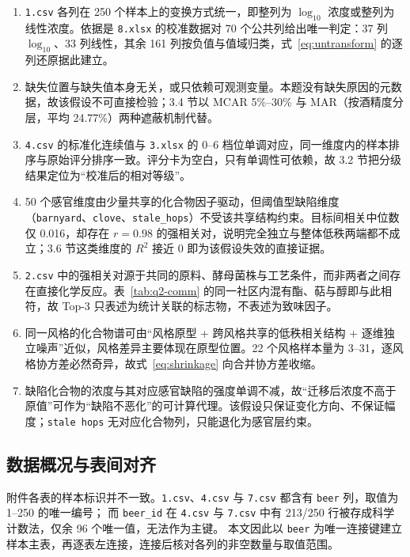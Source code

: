﻿\documentclass[UTF8,a4paper,zihao=-4]{ctexart}
\numberwithin{figure}{section}
\numberwithin{table}{section}
\numberwithin{equation}{section}
\newcommand{\file}[1]{\texttt{#1}}
\begin{document}
\begin{enumerate}[label=\textbf{假设 \arabic*},leftmargin=4.5em,itemsep=2pt,topsep=2pt,parsep=0pt]
  \item \file{1.csv} 各列在 250 个样本上的变换方式统一，即整列为 $\log_{10}$ 浓度或整列为线性浓度。依据是 \file{8.xlsx} 的校准数据对 70 个公共列给出唯一判定：37 列 $\log_{10}$、33 列线性，其余 161 列按负值与值域归类，式~\eqref{eq:untransform} 的逐列还原据此建立。

  \item 缺失位置与缺失值本身无关，或只依赖可观测变量。本题没有缺失原因的元数据，故该假设不可直接检验；3.4 节以 MCAR 5\%--30\% 与 MAR（按酒精度分层，平均 24.77\%）两种遮蔽机制代替。

  \item \file{4.csv} 的标准化连续值与 \file{3.xlsx} 的 0--6 档位单调对应，同一维度内的样本排序与原始评分排序一致。评分卡为空白，只有单调性可依赖，故 3.2 节把分级结果定位为“校准后的相对等级”。

  \item 50 个感官维度由少量共享的化合物因子驱动，但阈值型缺陷维度（\file{barnyard}、\file{clove}、\file{stale\_hops}）不受该共享结构约束。目标间相关中位数仅 0.016，却存在 $r=0.98$ 的强相关对，说明完全独立与整体低秩两端都不成立；3.6 节这类维度的 $R^2$ 接近 0 即为该假设失效的直接证据。

  \item \file{2.csv} 中的强相关对源于共同的原料、酵母菌株与工艺条件，而非两者之间存在直接化学反应。表~\ref{tab:q2-comm} 的同一社区内混有酯、萜与醇即与此相符，故 Top-3 只表述为统计关联的标志物，不表述为致味因子。

  \item 同一风格的化合物谱可由“风格原型 + 跨风格共享的低秩相关结构 + 逐维独立噪声”近似，风格差异主要体现在原型位置。22 个风格样本量为 3--31，逐风格协方差必然奇异，故式~\eqref{eq:shrinkage} 向合并协方差收缩。

  \item 缺陷化合物的浓度与其对应感官缺陷的强度单调不减，故“迁移后浓度不高于原值”可作为“缺陷不恶化”的可计算代理。该假设只保证变化方向、不保证幅度；\file{stale hops} 无对应化合物列，只能退化为感官层约束。
\end{enumerate}


\subsection{数据概况与表间对齐}

附件各表的样本标识并不一致。\file{1.csv}、\file{4.csv} 与 \file{7.csv} 都含有 \file{beer} 列，取值为 1--250 的唯一编号；
而 \file{beer\_id} 在 \file{4.csv} 与 \file{7.csv} 中有 213/250 行被存成科学计数法，仅余 96 个唯一值，无法作为主键。
本文因此以 \file{beer} 为唯一连接键建立样本主表，再逐表左连接，连接后核对各列的非空数量与取值范围。
\end{document}
